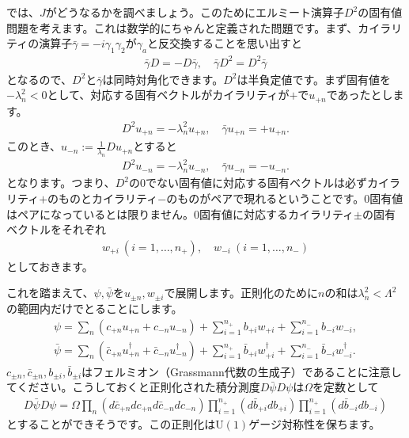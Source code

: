 \documentclass[paper=a4, fontsize=12pt, line_length=16cm, number_of_lines=33,dvipdfmx]{jlreq}
\numberwithin{equation}{section}
\newcommand{\psib}{\bar{\psi}}
\newcommand{\gammab}{\bar{\gamma}}
\newcommand{\cb}{\bar{c}}
\newcommand{\bb}{\bar{b}}
\newcommand{\U}{\mathrm{U}}
\begin{document}
では、$J$がどうなるかを調べましょう。このためにエルミート演算子$D^2$の固有値問題を考えます。これは数学的にちゃんと定義された問題です。まず、カイラリティの演算子$\gammab=-i\gamma_1\gamma_2$が$\gamma_a$と反交換することを思い出すと
\begin{align}
  \gammab D=-D\gammab,\quad \gammab D^2=D^2\gammab
\end{align}
となるので、$D^2$と$\gammab$は同時対角化できます。$D^2$は半負定値です。まず固有値を$-\lambda_n^2<0$として、対応する固有ベクトルがカイラリティが$+$で$u_{+n}$であったとします。
\begin{align}
  D^2u_{+n}=-\lambda_{n}^2u_{+n},\quad \gammab u_{+n}=+u_{+n}.
\end{align}
このとき、$u_{-n}:=\frac{1}{\lambda_n}Du_{+n}$とすると
\begin{align}
  D^2u_{-n}=-\lambda_{n}^2u_{-n},\quad \gammab u_{-n}=-u_{-n}.  
\end{align}
となります。つまり、$D^2$の$0$でない固有値に対応する固有ベクトルは必ずカイラリティ$+$のものとカイラリティ$-$のものがペアで現れるということです。$0$固有値はペアになっているとは限りません。$0$固有値に対応するカイラリティ$\pm$の固有ベクトルをそれぞれ
\begin{align}
  w_{+i}\ (i=1,\dots,n_+),\quad w_{-i}\ (i=1,\dots,n_-)
\end{align}
としておきます。

これを踏まえて、$\psi,\psib$を$u_{\pm n},w_{\pm i}$で展開します。正則化のために$n$の和は$\lambda_{n}^2<\Lambda^2$の範囲内だけでとることにします。
\begin{align}
  \psi=\sum_{n}(c_{+n}u_{+n}+c_{-n}u_{-n})
  +\sum_{i=1}^{n_+}b_{+i}w_{+i}
  +\sum_{i=1}^{n_-}b_{-i}w_{-i},\nonumber\\
  \psib=\sum_{n}(\cb_{+n}u_{+n}^{\dag}+\cb_{-n}u_{-n}^{\dag})
  +\sum_{i=1}^{n_+}\bb_{+i}w_{+i}^{\dag}
  +\sum_{i=1}^{n_-}\bb_{-i}w_{-i}^{\dag}.
\end{align}
$c_{\pm n},\cb_{\pm n}, b_{\pm i},\bb_{\pm i}$はフェルミオン（Grassmann代数の生成子）であることに注意してください。こうしておくと正則化された積分測度$D\psib D\psi$は$\Omega$を定数として
\begin{align}
  D\psib D\psi=\Omega \prod_{n}(d\cb_{+n}d c_{+n}d\cb_{-n}d c_{-n})\prod_{i=1}^{n_+}(d\bb_{+i}db_{+i})\prod_{i=1}^{n_+}(d\bb_{-i}db_{-i})\label{modeintegralmeasure}
\end{align}
とすることができそうです。この正則化は$\U(1)$ゲージ対称性を保ちます。
\end{document}

